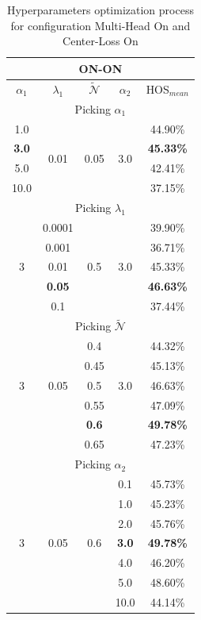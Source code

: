 \documentclass[10pt,twocolumn,letterpaper]{article}
\begin{document}
\begin{table}[b!]
  \centering
  \begin{tabular}[h]{||c|c|c|c||c||}
    \hline
    \multicolumn{5}{||c||}{ON-ON} \\
    \hline
    $\alpha_1$ & $\lambda_1$ & $\mathcal{\tilde N}$ & $\alpha_2$ & HOS$_{mean}$ \\
    \hline
    \hline
    \multicolumn{5}{||c||}{Picking $\alpha_1$} \\
    \hline
    1.0 & \multirow{4}{*}{0.01} & \multirow{4}{*}{0.05} & \multirow{4}{*}{3.0} & 44.90\% \\
    {\bf 3.0} & && & {\bf 45.33\%} \\
    5.0 & && & 42.41\% \\
    10.0 & && & 37.15\% \\
    \hline
    \hline
    \multicolumn{5}{||c||}{Picking $\lambda_1$} \\
    \hline
    \multirow{5}{*}{3} & 0.0001 & \multirow{5}{*}{0.5} & \multirow{5}{*}{3.0} & 39.90\% \\
    & 0.001 & & & 36.71\% \\
    & 0.01 & & & 45.33\% \\
    & {\bf 0.05 }& & & {\bf 46.63\%} \\
    & 0.1 & & & 37.44\% \\
    \hline
    \hline
    \multicolumn{5}{||c||}{Picking $\mathcal{\tilde N}$} \\
    \hline
    \multirow{5}{*}{3} & \multirow{5}{*}{0.05} & 0.4 & \multirow{5}{*}{3.0} & 44.32\% \\
    & & 0.45 & & 45.13\% \\
    & & 0.5 & & 46.63\% \\
    & & 0.55 & & 47.09\% \\
    & & {\bf 0.6} & & {\bf 49.78\%} \\
    & & 0.65 & & 47.23\% \\
    \hline
    \hline
    \multicolumn{5}{||c||}{Picking $\alpha_2$} \\
    \hline
    \multirow{7}{*}{3} & \multirow{7}{*}{0.05} & \multirow{7}{*}{0.6} & 0.1 & 45.73\% \\
    & & & 1.0 & 45.23\% \\
    & & & 2.0 & 45.76\% \\
    & & & {\bf 3.0} & {\bf 49.78\%} \\
    & & & 4.0 & 46.20\% \\
    & & & 5.0 & 48.60\% \\
    & & & 10.0 & 44.14\% \\
    \hline
  \end{tabular}
  \caption{\centering\label{tab:ablationonon} Hyperparameters optimization process for configuration Multi-Head On and Center-Loss On}
\end{table}
\end{document}
